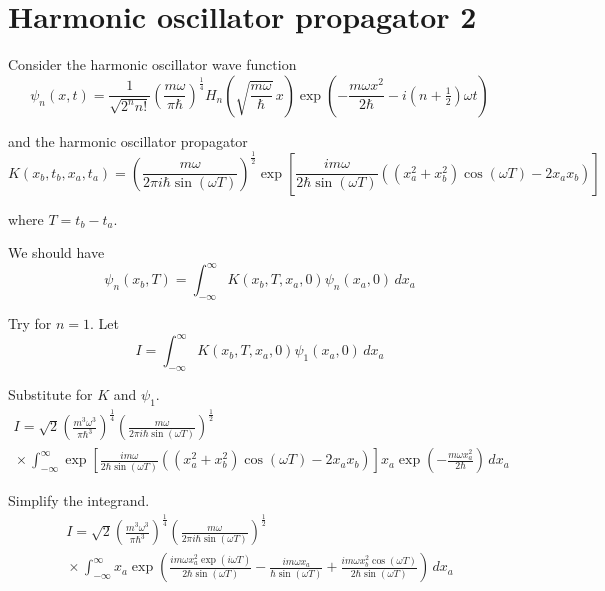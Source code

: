 


\section*{Harmonic oscillator propagator 2}

Consider the harmonic oscillator wave function
\begin{equation*}
\psi_n(x,t)=\frac{1}{\sqrt{2^nn!}}\left(\frac{m\omega}{\pi\hbar}\right)^\frac{1}{4}
H_n\left(\sqrt{\frac{m\omega}{\hbar}}\,x\right)
\exp\left(-\frac{m\omega x^2}{2\hbar}-i\left(n+\tfrac{1}{2}\right)\omega t\right)
\end{equation*}

and the harmonic oscillator propagator
\begin{equation*}
K(x_b,t_b,x_a,t_a)
=\left(\frac{m\omega}{2\pi i\hbar\sin(\omega T)}\right)^\frac{1}{2}
\exp\left[
\frac{im\omega}{2\hbar\sin(\omega T)}
\left((x_a^2+x_b^2)\cos(\omega T)-2x_ax_b\right)
\right]
\end{equation*}

where $T=t_b-t_a$.

\bigskip
We should have
\begin{equation*}
\psi_n(x_b,T)=\int_{-\infty}^\infty K(x_b,T,x_a,0)\psi_n(x_a,0)\,dx_a
\end{equation*}

Try for $n=1$. Let
\begin{equation*}
I=\int_{-\infty}^\infty K(x_b,T,x_a,0)\psi_1(x_a,0)\,dx_a
\end{equation*}

Substitute for $K$ and $\psi_1$.
\begin{multline*}
I=\sqrt2\left(\frac{m^3\omega^3}{\pi\hbar^3}\right)^\frac{1}{4}
\left(\frac{m\omega}{2\pi i\hbar\sin(\omega T)}\right)^\frac{1}{2}
\\
{}\times
\int_{-\infty}^\infty
\exp\left[
\frac{im\omega}{2\hbar\sin(\omega T)}
\left((x_a^2+x_b^2)\cos(\omega T)-2x_ax_b\right)
\right]
x_a\exp\left(-\frac{m\omega x_a^2}{2\hbar}\right)\,dx_a
\end{multline*}

Simplify the integrand.
\begin{multline*}
I=\sqrt2\left(\frac{m^3\omega^3}{\pi\hbar^3}\right)^\frac{1}{4}
\left(\frac{m\omega}{2\pi i\hbar\sin(\omega T)}\right)^\frac{1}{2}
\\
{}\times
\int_{-\infty}^\infty x_a\exp\left(
\frac{im\omega x_a^2\exp(i\omega T)}{2\hbar\sin(\omega T)}
-\frac{im\omega x_a}{\hbar\sin(\omega T)}
+\frac{im\omega x_b^2\cos(\omega T)}{2\hbar\sin(\omega T)}
\right)\,dx_a
\end{multline*}

